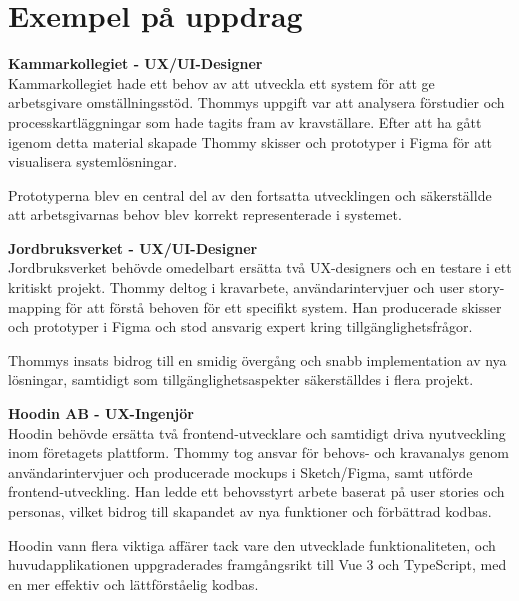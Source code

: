\documentclass[a4paper,10pt]{article}
\begin{document}
\vspace{0.5cm}

\section*{Exempel på uppdrag}

\textbf{Kammarkollegiet - UX/UI-Designer}\\
Kammarkollegiet hade ett behov av att utveckla ett system för att ge arbetsgivare omställningsstöd. Thommys uppgift var att analysera förstudier och processkartläggningar som hade tagits fram av kravställare. Efter att ha gått igenom detta material skapade Thommy skisser och prototyper i Figma för att visualisera systemlösningar. 

Prototyperna blev en central del av den fortsatta utvecklingen och säkerställde att arbetsgivarnas behov blev korrekt representerade i systemet.

\vspace{0.3cm}

\textbf{Jordbruksverket - UX/UI-Designer}\\
Jordbruksverket behövde omedelbart ersätta två UX-designers och en testare i ett kritiskt projekt. Thommy deltog i kravarbete, användarintervjuer och user story-mapping för att förstå behoven för ett specifikt system. Han producerade skisser och prototyper i Figma och stod ansvarig expert kring tillgänglighetsfrågor.

Thommys insats bidrog till en smidig övergång och snabb implementation av nya lösningar, samtidigt som tillgänglighetsaspekter säkerställdes i flera projekt.

\vspace{0.3cm}

\textbf{Hoodin AB - UX-Ingenjör}\\
Hoodin behövde ersätta två frontend-utvecklare och samtidigt driva nyutveckling inom företagets plattform. Thommy tog ansvar för behovs- och kravanalys genom användarintervjuer och producerade mockups i Sketch/Figma, samt utförde frontend-utveckling. Han ledde ett behovsstyrt arbete baserat på user stories och personas, vilket bidrog till skapandet av nya funktioner och förbättrad kodbas.

\vspace{0.3cm}

Hoodin vann flera viktiga affärer tack vare den utvecklade funktionaliteten, och huvudapplikationen uppgraderades framgångsrikt till Vue 3 och TypeScript, med en mer effektiv och lättförståelig kodbas.
\end{document}
